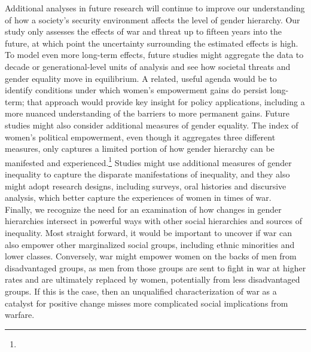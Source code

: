 \documentclass [12pt] {article}
\begin{document}
Additional analyses in future research will continue to improve our understanding of how a society's security environment affects the level of gender hierarchy. Our study only assesses the effects of war and threat up to fifteen years into the future, at which point the uncertainty surrounding the estimated effects is high. To model even more long-term effects, future studies might aggregate the data to decade or generational-level units of analysis and see how societal threats and gender equality move in equilibrium. A related, useful agenda would be to identify conditions under which women's empowerment gains do persist long-term; that approach would provide key insight for policy applications, including a more nuanced understanding of the barriers to more permanent gains. Future studies might also consider additional measures of gender equality. The index of women's political empowerment, even though it aggregates three different measures, only captures a limited portion of how gender hierarchy can be manifested and experienced.\footnote{} Studies might use additional measures of gender inequality to capture the disparate manifestations of inequality, and they also might adopt research designs, including surveys, oral histories and discursive analysis, which better capture the experiences of women in times of war.\\

 Finally, we recognize the need for an examination of how changes in gender hierarchies intersect in powerful ways with other social hierarchies and sources of inequality. Most straight forward, it would be important to uncover if war can also empower other marginalized social groups, including ethnic minorities and lower classes. Conversely, war might empower women on the backs of men from disadvantaged groups, as men from those groups are sent to fight in war at higher rates and are ultimately replaced by women, potentially from less disadvantaged groups. If this is the case, then an unqualified characterization of war as a catalyst for positive change misses more complicated social implications from warfare. \\

\setlength{\parskip}{2em}
\singlespacing	
\normalsize



\newpage
\end{document}
